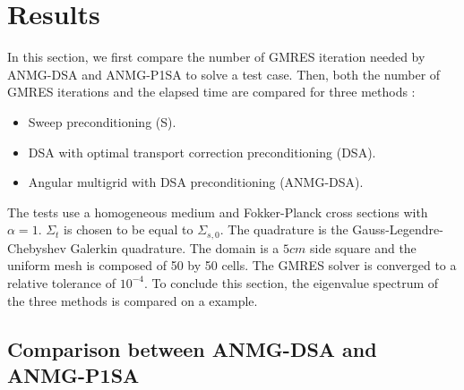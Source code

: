 \documentclass[preprint,10pt]{elsarticle}
\renewcommand{\(}{\left(}
\renewcommand{\)}{\right)}
\renewcommand{\[}{\left[}
\renewcommand{\]}{\right]}
\begin{document}
\section{Results} \label{sec:results}

In this section, we first compare the number of GMRES iteration needed by 
ANMG-DSA and ANMG-P1SA to solve a test case. Then, both the number of GMRES 
iterations and the elapsed time are compared for three methods :
\begin{itemize}
\item Sweep preconditioning (S).
\item DSA with optimal transport correction preconditioning (DSA).
\item Angular multigrid with DSA preconditioning (ANMG-DSA).
\end{itemize}
The tests use a homogeneous medium and Fokker-Planck cross
sections with $\alpha=1$. $\Sigma_{t}$ is chosen to be equal to
$\Sigma_{s,0}$. The quadrature is the Gauss-Legendre-Chebyshev Galerkin
quadrature. The domain is a $5cm$ side square and the uniform mesh is composed
of 50 by 50 
cells. The GMRES solver is converged to a relative tolerance of $10^{-4}$. To
conclude this section, the eigenvalue spectrum of the three methods is
compared on a example.

\subsection{Comparison between ANMG-DSA and ANMG-P1SA}
\end{document}
